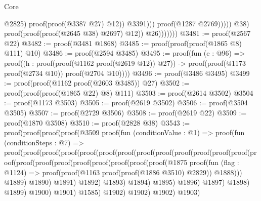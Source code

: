 \begin{lexlean}{Core}
\begin{coremodule}
                                                @2825)
                                              proof(proof(@3387 @27) @12))
                                            @3391)))
                                    proof(@1287 @2769)))))
                        @38)
                      proof(proof(proof(@2645 @38) @2697) @12))
                    @26)))))))
@3481 := proof(@2567 @22)
@3482 := proof(@3481 @1868)
@3485 := proof(proof(proof(@1865 @8) @111) @10)
@3486 := proof(@2594 @3485)
@3495 := proof(fun (e : @96) =>
    proof((h : proof(proof(@1162 proof(@2619 @12)) @27)) ->
      proof(proof(@1173 proof(@2734 @10)) proof(@2704 @10))))
@3496 := proof(@3486 @3495)
@3499 := proof(proof(@1162 proof(@2603 @3485)) @27)
@3502 := proof(proof(proof(@1865 @22) @8) @111)
@3503 := proof(@2614 @3502)
@3504 := proof(@1173 @3503)
@3505 := proof(@2619 @3502)
@3506 := proof(@3504 @3505)
@3507 := proof(@2729 @3506)
@3508 := proof(@2619 @22)
@3509 := proof(@1870 @3508)
@3510 := proof(@2828 @38)
@3543 := proof(proof(proof(proof(@3509
            proof(fun (conditionValue : @1) =>
              proof(fun (conditionSteps : @7) =>
                proof(proof(proof(proof(proof(proof(proof(proof(proof(proof(proof(proof(proof(proof(proof(proof(proof(proof(proof(proof(proof(proof(@1875
                                                              proof(fun (flag : @1124) =>
                                                                proof(proof(@1163
                                                                      proof(proof(@1886 @3510)
                                                                          @2829))
                                                                    @1888)))
                                                            @1889)
                                                          @1890)
                                                        @1891)
                                                      @1892)
                                                    @1893)
                                                  @1894)
                                                @1895)
                                              @1896)
                                            @1897)
                                          @1898)
                                        @1899)
                                      @1900)
                                    @1901)
                                  @1585)
                                @1902)
                              @1902)
                            @1902)
                          @1903)

\end{coremodule}
\end{lexlean}
